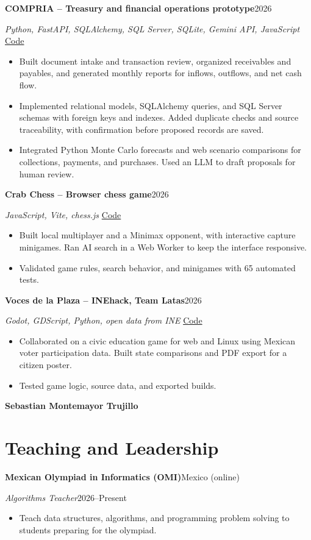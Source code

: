 \documentclass[11pt,letterpaper]{article}
\newcommand{\entry}[2]{\textbf{#1}\hfill #2\par}
\begin{document}
\entry{COMPRIA -- Treasury and financial operations prototype}{2026}
\textit{Python, FastAPI, SQLAlchemy, SQL Server, SQLite, Gemini API, JavaScript}
\hfill\href{https://github.com/emmanuelmarioarevalolimon-bit/Cashflow-coach}{Code}
\begin{itemize}
\item Built document intake and transaction review, organized receivables and payables, and generated monthly reports for inflows, outflows, and net cash flow.
\item Implemented relational models, SQLAlchemy queries, and SQL Server schemas with foreign keys and indexes. Added duplicate checks and source traceability, with confirmation before proposed records are saved.
\item Integrated Python Monte Carlo forecasts and web scenario comparisons for collections, payments, and purchases. Used an LLM to draft proposals for human review.
\end{itemize}

\entry{Crab Chess -- Browser chess game}{2026}
\textit{JavaScript, Vite, chess.js}
\hfill\href{https://github.com/SebastianMontemayorTrujillo/xdchess}{Code}
\begin{itemize}
\item Built local multiplayer and a Minimax opponent, with interactive capture minigames. Ran AI search in a Web Worker to keep the interface responsive.
\item Validated game rules, search behavior, and minigames with 65 automated tests.
\end{itemize}

\entry{Voces de la Plaza -- INEhack, Team Latas}{2026}
\textit{Godot, GDScript, Python, open data from INE}
\hfill\href{https://github.com/SebastianMontemayorTrujillo/inehack}{Code}
\begin{itemize}
\item Collaborated on a civic education game for web and Linux using Mexican voter participation data. Built state comparisons and PDF export for a citizen poster.
\item Tested game logic, source data, and exported builds.
\end{itemize}

\newpage
{\large\bfseries\color{ink} Sebastian Montemayor Trujillo}\par
\section*{Teaching and Leadership}
\entry{Mexican Olympiad in Informatics (OMI)}{Mexico (online)}
\textit{Algorithms Teacher}\hfill 2026--Present
\begin{itemize}
\item Teach data structures, algorithms, and programming problem solving to students preparing for the olympiad.
\end{itemize}
\end{document}
